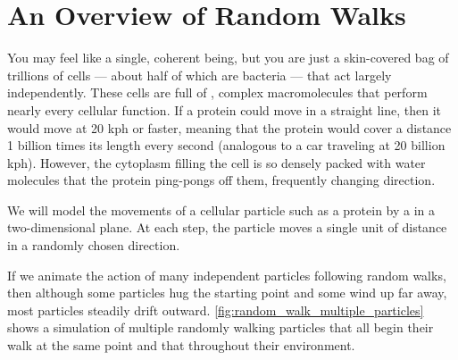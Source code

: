 \FloatBarrier
{}

\section{An Overview of Random Walks}
\label{sec:an_overview_of_random_walks}

You may feel like a single, coherent being, but you are just a skin-covered bag of trillions of cells --- about half of which are bacteria --- that act largely independently. These cells are full of , complex macromolecules that perform nearly every cellular function. If a protein could move in a straight line, then it would move at 20 kph or faster, meaning that the protein would cover a distance 1 billion times its length every second (analogous to a car traveling at 20 billion kph). However, the cytoplasm filling the cell is so densely packed with water molecules that the protein ping-pongs off them, frequently changing direction.

We will model the movements of a cellular particle such as a protein by a  in a two-dimensional plane. At each step, the particle moves a single unit of distance in a randomly chosen direction.

If we animate the action of many independent particles following random walks, then although some particles hug the starting point and some wind up far away, most particles steadily drift outward. \autoref{fig:random_walk_multiple_particles} shows a simulation of multiple randomly walking particles that all begin their walk at the same point and that  throughout their environment.
\\

